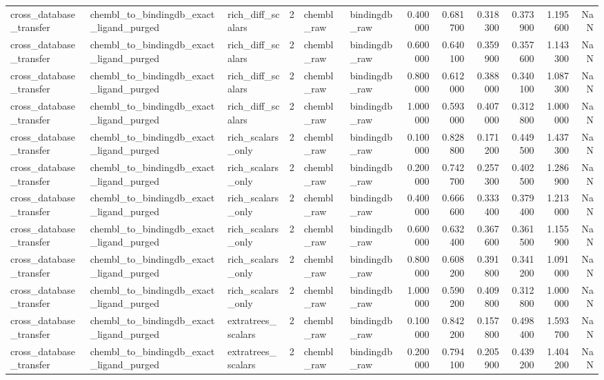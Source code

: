\begin{longtable}{lllrllrrrrrr}
cross\_database\_transfer & chembl\_to\_bindingdb\_exact\_ligand\_purged & rich\_diff\_scalars & 2 & chembl\_raw & bindingdb\_raw & 0.400000 & 0.681700 & 0.318300 & 0.373900 & 1.195600 & NaN \\
cross\_database\_transfer & chembl\_to\_bindingdb\_exact\_ligand\_purged & rich\_diff\_scalars & 2 & chembl\_raw & bindingdb\_raw & 0.600000 & 0.640100 & 0.359900 & 0.357600 & 1.143300 & NaN \\
cross\_database\_transfer & chembl\_to\_bindingdb\_exact\_ligand\_purged & rich\_diff\_scalars & 2 & chembl\_raw & bindingdb\_raw & 0.800000 & 0.612000 & 0.388000 & 0.340100 & 1.087300 & NaN \\
cross\_database\_transfer & chembl\_to\_bindingdb\_exact\_ligand\_purged & rich\_diff\_scalars & 2 & chembl\_raw & bindingdb\_raw & 1.000000 & 0.593000 & 0.407000 & 0.312800 & 1.000000 & NaN \\
cross\_database\_transfer & chembl\_to\_bindingdb\_exact\_ligand\_purged & rich\_scalars\_only & 2 & chembl\_raw & bindingdb\_raw & 0.100000 & 0.828800 & 0.171200 & 0.449500 & 1.437300 & NaN \\
cross\_database\_transfer & chembl\_to\_bindingdb\_exact\_ligand\_purged & rich\_scalars\_only & 2 & chembl\_raw & bindingdb\_raw & 0.200000 & 0.742700 & 0.257300 & 0.402500 & 1.286900 & NaN \\
cross\_database\_transfer & chembl\_to\_bindingdb\_exact\_ligand\_purged & rich\_scalars\_only & 2 & chembl\_raw & bindingdb\_raw & 0.400000 & 0.666600 & 0.333400 & 0.379400 & 1.213000 & NaN \\
cross\_database\_transfer & chembl\_to\_bindingdb\_exact\_ligand\_purged & rich\_scalars\_only & 2 & chembl\_raw & bindingdb\_raw & 0.600000 & 0.632400 & 0.367600 & 0.361500 & 1.155900 & NaN \\
cross\_database\_transfer & chembl\_to\_bindingdb\_exact\_ligand\_purged & rich\_scalars\_only & 2 & chembl\_raw & bindingdb\_raw & 0.800000 & 0.608200 & 0.391800 & 0.341200 & 1.091000 & NaN \\
cross\_database\_transfer & chembl\_to\_bindingdb\_exact\_ligand\_purged & rich\_scalars\_only & 2 & chembl\_raw & bindingdb\_raw & 1.000000 & 0.590200 & 0.409800 & 0.312800 & 1.000000 & NaN \\
cross\_database\_transfer & chembl\_to\_bindingdb\_exact\_ligand\_purged & extratrees\_scalars & 2 & chembl\_raw & bindingdb\_raw & 0.100000 & 0.842200 & 0.157800 & 0.498400 & 1.593700 & NaN \\
cross\_database\_transfer & chembl\_to\_bindingdb\_exact\_ligand\_purged & extratrees\_scalars & 2 & chembl\_raw & bindingdb\_raw & 0.200000 & 0.794100 & 0.205900 & 0.439200 & 1.404200 & NaN \\

\end{longtable}
